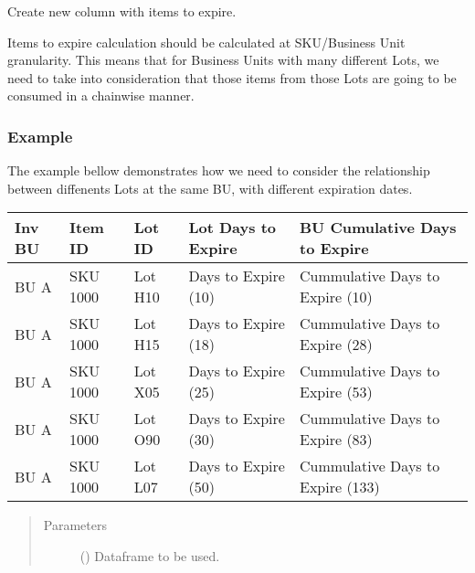 \documentclass[letterpaper,10pt,english]{sphinxmanual}
\begin{document}
\begin{fulllineitems}
\label{\detokenize{source/optimization.datatools:optimization.datatools.dataprep.items_to_expire}}
Create new column with items to expire.

Items to expire calculation should be calculated
at SKU/Business Unit granularity. This means that for
Business Units with many different Lots, we need to take
into consideration that those items from those Lots are going
to be consumed in a chainwise manner.
\subsubsection*{Example}

The example bellow demonstrates how we need to consider the relationship between
diffenents Lots at the same BU, with different expiration dates.


\begin{savenotes}\sphinxattablestart
\centering
\begin{tabulary}{\linewidth}[t]{|T|T|T|T|T|}
\hline
\sphinxstyletheadfamily 
Inv BU
&\sphinxstyletheadfamily 
Item ID
&\sphinxstyletheadfamily 
Lot ID
&\sphinxstyletheadfamily 
Lot Days to Expire
&\sphinxstyletheadfamily 
BU Cumulative Days to Expire
\\
\hline
BU A
&
SKU 1000
&
Lot H10
&
Days to Expire (10)
&
Cummulative Days to Expire (10)
\\
\hline
BU A
&
SKU 1000
&
Lot H15
&
Days to Expire (18)
&
Cummulative Days to Expire (28)
\\
\hline
BU A
&
SKU 1000
&
Lot X05
&
Days to Expire (25)
&
Cummulative Days to Expire (53)
\\
\hline
BU A
&
SKU 1000
&
Lot O90
&
Days to Expire (30)
&
Cummulative Days to Expire (83)
\\
\hline
BU A
&
SKU 1000
&
Lot L07
&
Days to Expire (50)
&
Cummulative Days to Expire (133)
\\
\hline
\end{tabulary}
\par
\sphinxattableend\end{savenotes}
\begin{quote}\begin{description}
\item[{Parameters}] \leavevmode
{} () \textendash{} Dataframe to be used.


\end{description}
\end{quote}
\end{fulllineitems}
\end{document}
